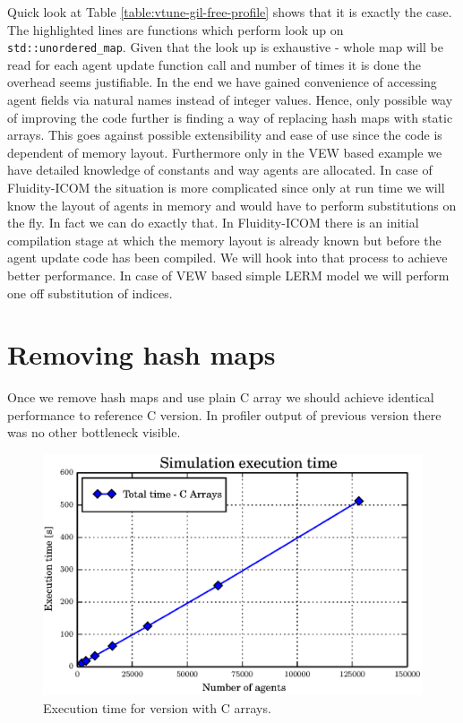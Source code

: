 \documentclass[12pt, a4paper]{report}
\begin{document}
Quick look at Table \ref{table:vtune-gil-free-profile} shows that it is exactly the case.
The highlighted lines are functions which perform look up on \lstinline{std::unordered_map}.
Given that the look up is exhaustive - whole map will be read for each agent update function
call and number of times it is done the overhead seems justifiable. In the end we have
gained convenience of accessing agent fields via natural names instead of integer values.
Hence, only possible way of improving the code further is finding a way of replacing
hash maps with static arrays. This goes against possible extensibility and ease of use since
the code is dependent of memory layout. Furthermore only in the VEW based example we have
detailed knowledge of constants and way agents are allocated. In case of Fluidity-ICOM
the situation is more complicated since only at run time we will know the layout of agents
in memory and would have to perform substitutions on the fly. In fact we can do exactly that.
In Fluidity-ICOM there is an initial compilation stage at which the memory layout is already
known but before the agent update code has been compiled. We will hook into that process
to achieve better performance. In case of VEW based simple LERM model we will perform one
off substitution of indices.

\section{Removing hash maps}\label{sec:remove-dict}
Once we remove hash maps and use plain C array we should achieve identical performance
to reference C version. In profiler output of previous version there was no other bottleneck
visible.

\begin{figure}[H]
  \begin{center}
    \includegraphics[width=\columnwidth]{graphs/dict-array-perf.eps}
    \caption{Execution time for version with C arrays.}
    \label{fig:dict-array-perf}
  \end{center}
\end{figure}
\end{document}
